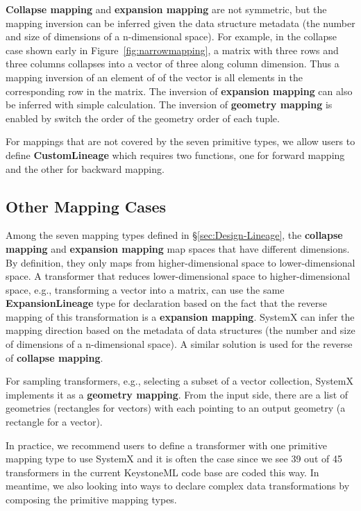 \documentclass{sig-alternate}
\begin{document}
{\bf Collapse mapping} and {\bf expansion mapping} are not symmetric, but the mapping inversion can be inferred
given the data structure metadata (the number and size of dimensions of a n-dimensional space). For example, 
in the collapse case shown early in Figure~\ref{fig:narrowmapping}, a matrix with three rows and three columns
collapses into a vector of three along column dimension. Thus a mapping inversion of an element of of the vector
is all elements in the corresponding row in the matrix. 
The inversion of {\bf expansion mapping} can also be inferred with simple calculation.
The inversion of {\bf geometry mapping} is enabled by switch the order of the geometry order of each tuple.

For mappings that are not covered by the seven primitive types, we allow users to define {\bf CustomLineage}
which requires two functions, one for forward mapping and the other for backward mapping.

\subsection{Other Mapping Cases}
Among the seven mapping types defined in \S\ref{sec:Design-Lineage}, the {\bf collapse mapping} and {\bf expansion mapping}
map spaces that have different dimensions. By definition, they only maps from higher-dimensional space to lower-dimensional space.
A transformer that reduces lower-dimensional space to higher-dimensional space, e.g., transforming a vector into a matrix, can use
the same {\bf ExpansionLineage} type for declaration based on the fact that the reverse mapping of this transformation is a
{\bf expansion mapping}. SystemX can infer the mapping direction based on the metadata of data structures 
(the number and size of dimensions of a n-dimensional space). 
A similar solution is used for the reverse of {\bf collapse mapping}.

For sampling transformers, e.g., selecting a subset of a vector collection, SystemX implements it as a {\bf geometry mapping}.
From the input side, there are a list of geometries (rectangles for vectors) with each pointing to an output geometry (a rectangle for a vector).

In practice, we recommend users to define a transformer with one primitive mapping type to use SystemX and it is often the case since
we see 39 out of 45 transformers in the current KeystoneML code base are coded this way. 
In meantime, we also looking into ways to declare complex data transformations by composing the primitive mapping types.
\end{document}
